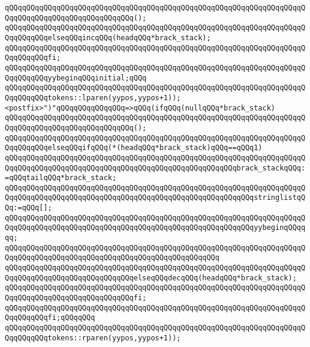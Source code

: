 \verb|qQQqqQQqqQQqqQQqqQQqqQQqqQQqqQQqqQQqqQQqqQQqqQQqqQQqqQQqqQQqqQQqqQQqqQQqqQQqqQQqqQQqqQQqqQQqqQQqqQQq();|\newline
\verb|qQQqqQQqqQQqqQQqqQQqqQQqqQQqqQQqqQQqqQQqqQQqqQQqqQQqqQQqqQQqqQQqqQQqqQQqqQQqqQQqelseqQQqincqQQq(headqQQq*brack_stack);|\newline
\verb|qQQqqQQqqQQqqQQqqQQqqQQqqQQqqQQqqQQqqQQqqQQqqQQqqQQqqQQqqQQqqQQqqQQqqQQqqQQqqQQqfi;|\newline
\verb|qQQqqQQqqQQqqQQqqQQqqQQqqQQqqQQqqQQqqQQqqQQqqQQqqQQqqQQqqQQqqQQqqQQqqQQqqQQqqQQqyybeginqQQqinitial;qQQq|\newline
\verb|qQQqqQQqqQQqqQQqqQQqqQQqqQQqqQQqqQQqqQQqqQQqqQQqqQQqqQQqqQQqqQQqqQQqqQQqqQQqqQQqtokens::lparen(yypos,yypos+1));|\newline
\verb|<postfix>")"qQQqqQQqqQQqqQQq=>qQQq(ifqQQq(nullqQQq*brack_stack)|\newline
\verb|qQQqqQQqqQQqqQQqqQQqqQQqqQQqqQQqqQQqqQQqqQQqqQQqqQQqqQQqqQQqqQQqqQQqqQQqqQQqqQQqqQQqqQQqqQQqqQQqqQQq();|\newline
\verb|qQQqqQQqqQQqqQQqqQQqqQQqqQQqqQQqqQQqqQQqqQQqqQQqqQQqqQQqqQQqqQQqqQQqqQQqqQQqqQQqelseqQQqifqQQq(*(headqQQq*brack_stack)qQQq==qQQq1)|\newline
\verb|qQQqqQQqqQQqqQQqqQQqqQQqqQQqqQQqqQQqqQQqqQQqqQQqqQQqqQQqqQQqqQQqqQQqqQQqqQQqqQQqqQQqqQQqqQQqqQQqqQQqqQQqqQQqqQQqqQQqqQQqqQQqbrack_stackqQQq:=qQQqtailqQQq*brack_stack;|\newline
\verb|qQQqqQQqqQQqqQQqqQQqqQQqqQQqqQQqqQQqqQQqqQQqqQQqqQQqqQQqqQQqqQQqqQQqqQQqqQQqqQQqqQQqqQQqqQQqqQQqqQQqqQQqqQQqqQQqqQQqqQQqqQQqqQQqstringlistqQQq:=qQQq[];|\newline
\verb|qQQqqQQqqQQqqQQqqQQqqQQqqQQqqQQqqQQqqQQqqQQqqQQqqQQqqQQqqQQqqQQqqQQqqQQqqQQqqQQqqQQqqQQqqQQqqQQqqQQqqQQqqQQqqQQqqQQqqQQqqQQqqQQqyybeginqQQqqqq;|\newline
\verb|qQQqqQQqqQQqqQQqqQQqqQQqqQQqqQQqqQQqqQQqqQQqqQQqqQQqqQQqqQQqqQQqqQQqqQQqqQQqqQQqqQQqqQQqqQQqqQQqqQQqqQQqqQQqqQQqqQQqqQQq|\newline
\verb|qQQqqQQqqQQqqQQqqQQqqQQqqQQqqQQqqQQqqQQqqQQqqQQqqQQqqQQqqQQqqQQqqQQqqQQqqQQqqQQqqQQqqQQqqQQqqQQqqQQqelseqQQqdecqQQq(headqQQq*brack_stack);|\newline
\verb|qQQqqQQqqQQqqQQqqQQqqQQqqQQqqQQqqQQqqQQqqQQqqQQqqQQqqQQqqQQqqQQqqQQqqQQqqQQqqQQqqQQqqQQqqQQqqQQqqQQqfi;|\newline
\verb|qQQqqQQqqQQqqQQqqQQqqQQqqQQqqQQqqQQqqQQqqQQqqQQqqQQqqQQqqQQqqQQqqQQqqQQqqQQqqQQqfi;qQQqqQQq|\newline
\verb|qQQqqQQqqQQqqQQqqQQqqQQqqQQqqQQqqQQqqQQqqQQqqQQqqQQqqQQqqQQqqQQqqQQqqQQqqQQqqQQqtokens::rparen(yypos,yypos+1));|\newline
